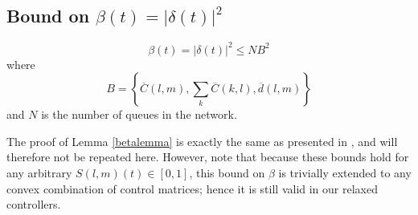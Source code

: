 \subsection*{Bound on $\beta(t) = \vert \delta (t)\vert^{2}$}
%
\begin{Lem} \label{betalemma}
\begin{equation}\label{betabound}
\beta(t)  = \big| \delta(t) \big|^2 \leq NB^2 
\end{equation}
where 
\begin{equation}
B = \left\{ \overline{C}(l,m), \sum_{k} \overline{C}(k,l),  \overline d (l,m) \right\}
\end{equation}
and $N$ is the number of queues in the network. 
\end{Lem}
The proof of Lemma \ref{betalemma} is exactly the same as presented in \cite{MaxPressureStochastic}, and will therefore not be repeated here. However, note that because these bounds hold for any arbitrary $S(l,m)(t) \in [0,1]$, this bound on $\beta$ is trivially extended to any convex combination of control matrices; hence it is still valid in our relaxed controllers.


